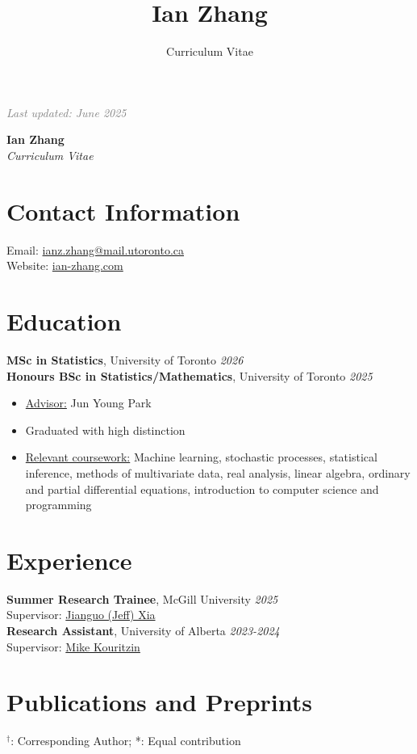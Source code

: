 \documentclass[11pt]{article}
\title{Ian Zhang}
\author{Curriculum Vitae}
\theoremstyle{definition}
\newcommand{\1}{\mathds 1}
\begin{document}
\sloppy
\hfill {\scriptsize\textit{\textcolor{gray}{Last updated: June 2025}}}
\begin{center}
    {\huge \textbf{Ian Zhang}}\\
    \textit{Curriculum Vitae}
\end{center}

\section*{Contact Information}
Email: \href{mailto:ianz.zhang@mail.utoronto.ca}{ianz.zhang@mail.utoronto.ca}\\
Website: \href{www.ian-zhang.com}{ian-zhang.com}

\section*{Education}
\textbf{MSc in Statistics}, University of Toronto \hfill \textit{2026}\\
\textbf{Honours BSc in Statistics/Mathematics}, University of Toronto \hfill \textit{2025}
\begin{itemize}[itemsep=2pt, parsep=0pt, topsep=0pt]
    \item \underline{Advisor:} Jun Young Park
    \item Graduated with high distinction
    \item \underline{Relevant coursework:} Machine learning, stochastic processes, statistical inference, methods of multivariate data, real analysis, linear algebra, ordinary and partial differential equations, introduction to computer science and programming
  \end{itemize}
  

\section*{Experience}
\textbf{Summer Research Trainee}, McGill University \hfill \textit{2025}\\
\indent\hspace{0.2cm} Supervisor: \href{https://www.xialab.ca/}{Jianguo (Jeff) Xia}\\
\textbf{Research Assistant}, University of Alberta \hfill \textit{2023-2024}\\
\indent\hspace{0.2cm} Supervisor: \href{https://www.math.ualberta.ca/~mkouritz/Kouritzin_M.html}{Mike Kouritzin}

\section*{Publications and Preprints}
{\small $^\dag$: Corresponding Author; \hspace{1cm} *: Equal contribution}
\end{document}
